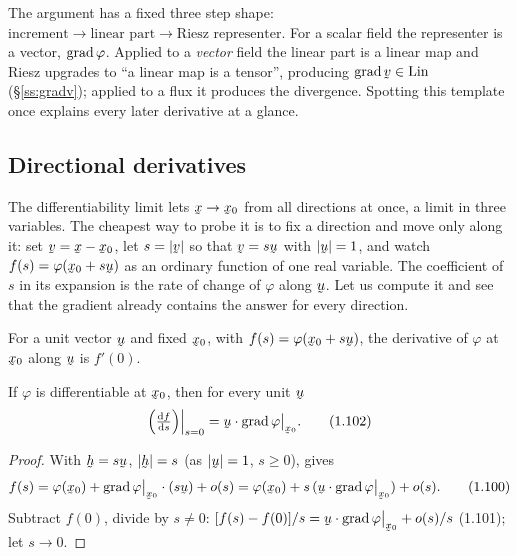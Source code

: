 \begin{remark}\label{rem:double}
The argument has a fixed three step shape:
$\text{increment}\to\text{linear part}\to\text{Riesz representer}$. For a
scalar field the representer is a vector, $\operatorname{grad}\varphi$. Applied to a
\emph{vector} field the linear part is a linear map and Riesz upgrades to
``a linear map is a tensor'', producing $\grad\bv\in\Lin$
(\S\ref{ss:gradv}); applied to a flux it produces the divergence. Spotting
this template once explains every later derivative at a glance.
\end{remark}

\subsection{Directional derivatives}\label{ss:dir}

The differentiability limit  lets $\bx\to\bx_0$ from all directions
at once, a limit in three variables. The cheapest way to probe it is to fix
a direction and move only along it: set $\bv=\bx-\bx_0$, let $s=|\bv|$ so
that $\bv=s\bu$ with $|\bu|=1$, and watch
$f(s)=\varphi(\bx_0+s\bu)$ as an ordinary function of one real variable.
The coefficient of $s$ in its expansion is the rate of change of $\varphi$
along $\bu$. Let us compute it and see that the gradient already contains
the answer for every direction.

\begin{definition}\label{def:dir}
For a unit vector $\bu$ and fixed $\bx_0$, with $f(s)=\varphi(\bx_0+s\bu)$,
the derivative of $\varphi$ at $\bx_0$ along $\bu$ is $f'(0)$.
\end{definition}

\begin{theorem}\label{thm:dir}
If $\varphi$ is differentiable at $\bx_0$, then for every unit $\bu$
\begin{equation}
\Big(\tfrac{\dl f}{\dl s}\Big)\Big|_{s=0}=\bu\cdot\grad\varphi\rest{\bx_0}.
\tag{1.102}\label{eq:1.102}
\end{equation}
\end{theorem}

\begin{proof}
With $\bh=s\bu$, $|\bh|=s$ (as $|\bu|=1$, $s\ge0$),  gives
\begin{equation}
f(s)=\varphi(\bx_0)+\grad\varphi\rest{\bx_0}\cdot(s\bu)+o(s)
=\varphi(\bx_0)+s\,(\bu\cdot\grad\varphi\rest{\bx_0})+o(s). \tag{1.100}\label{eq:1.100}
\end{equation}
Subtract $f(0)$, divide by $s\neq0$:
$[f(s)-f(0)]/s=\bu\cdot\grad\varphi\rest{\bx_0}+o(s)/s$ (1.101); let
$s\to0$.
\end{proof}

